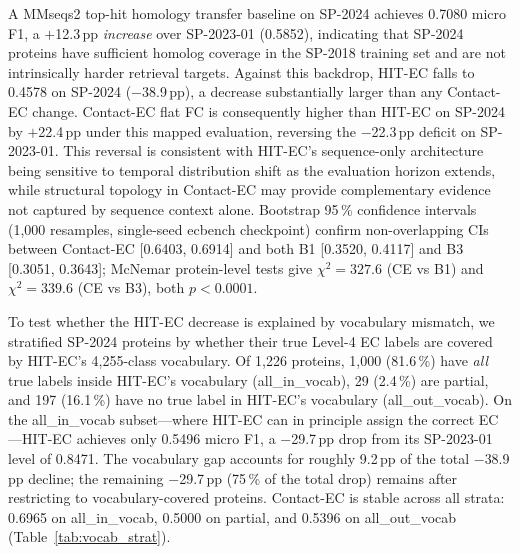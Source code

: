 \documentclass[numbered,contemporary,mediumone]{oup-authoring-template}
\begin{document}
A MMseqs2 top-hit homology transfer baseline on SP-2024 achieves 0.7080
micro F1, a $+$12.3\,pp \emph{increase} over SP-2023-01 (0.5852), indicating
that SP-2024 proteins have sufficient homolog coverage in the SP-2018 training
set and are not intrinsically harder retrieval targets. Against this backdrop,
HIT-EC falls to 0.4578 on SP-2024 ($-$38.9\,pp), a decrease
substantially larger than any Contact-EC change. Contact-EC flat FC is consequently
higher than HIT-EC on SP-2024 by $+$22.4\,pp under this mapped evaluation, reversing the $-$22.3\,pp
deficit on SP-2023-01. This reversal is consistent with HIT-EC's sequence-only
architecture being sensitive to temporal distribution shift as the evaluation
horizon extends, while structural topology in Contact-EC may provide
complementary evidence not captured by sequence context alone. Bootstrap 95\,\% confidence
intervals (1{,}000 resamples, single-seed ecbench checkpoint) confirm
non-overlapping CIs between Contact-EC [0.6403, 0.6914] and both B1 [0.3520,
0.4117] and B3 [0.3051, 0.3643]; McNemar protein-level tests give
$\chi^2\!=\!327.6$ (CE vs B1) and $\chi^2\!=\!339.6$ (CE vs B3), both $p<0.0001$.

To test whether the HIT-EC decrease is explained by vocabulary
mismatch, we stratified SP-2024 proteins by whether their true Level-4
EC labels are covered by HIT-EC's 4{,}255-class vocabulary. Of 1{,}226
proteins, 1{,}000 (81.6\,\%) have \emph{all} true labels inside HIT-EC's
vocabulary (all\_in\_vocab), 29 (2.4\,\%) are partial, and 197 (16.1\,\%)
have no true label in HIT-EC's vocabulary (all\_out\_vocab).
On the all\_in\_vocab subset---where HIT-EC can in principle assign the
correct EC---HIT-EC achieves only 0.5496 micro F1, a $-$29.7\,pp drop
from its SP-2023-01 level of 0.8471. The vocabulary gap accounts for
roughly 9.2\,pp of the total $-$38.9\,pp decline; the remaining
$-$29.7\,pp (75\,\% of the total drop) remains after restricting to
vocabulary-covered proteins. Contact-EC is stable across all strata: 0.6965 on
all\_in\_vocab, 0.5000 on partial, and 0.5396 on all\_out\_vocab (Table~\ref{tab:vocab_strat}).
\end{document}
